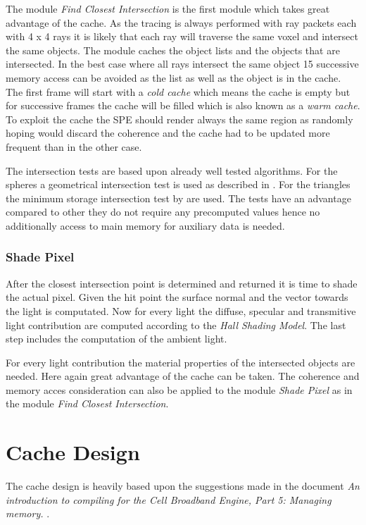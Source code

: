 \documentclass[DIV10, abstracton, openright, footsepline, headsepline, twoside, 9pt,
bigheadings]{scrreprt}
\begin{document}
The module \textit{Find Closest Intersection} is the first module which takes
great advantage of the cache. As the tracing is always performed with ray packets
each with 4 x 4 rays it is likely that each ray will traverse the same voxel
and intersect the same objects. The module caches the object lists and the objects
that are intersected. In the best case where all rays intersect the same object
15 successive memory access can be avoided as the list as well as the object
is in the cache. The first frame will start with a \textit{cold cache} which means
the cache is empty but for successive frames the  cache will be filled which
is also known as a \textit{warm cache}. To exploit the cache the SPE should
render always the same region as randomly hoping would discard the coherence
and the cache had to be updated more frequent than in the other case.

The intersection tests are based upon already well tested algorithms. For the
spheres a geometrical intersection test is used as described in
\cite{Glassner89}. For the triangles the minimum storage intersection test by
\cite{Trumbore97} are used. The tests have an advantage compared to other they do not
require any precomputed values hence no additionally access to main memory
for auxiliary data is needed.

\subsubsection{Shade Pixel}
\label{sec:shade_pixel}
After the closest intersection point is determined and returned it is time
to shade the actual pixel. Given the hit point the surface normal and the vector
towards the light is computated. Now for every light the diffuse, specular and
transmitive light contribution are computed according to the \textit{Hall
Shading Model}. The last step includes the computation of the ambient light.

For every light contribution the material properties of the intersected objects
are needed. Here again great advantage of the cache can be taken. The coherence
and memory acces consideration can also be applied to the module
\textit{Shade Pixel} as in the module \textit{Find Closest Intersection}.

\newpage
\section{Cache Design}

The cache design is heavily based upon the suggestions made in the document
\textit{An introduction to compiling for the Cell Broadband Engine, Part 5:
Managing memory.} \cite{Part5}.
\end{document}

